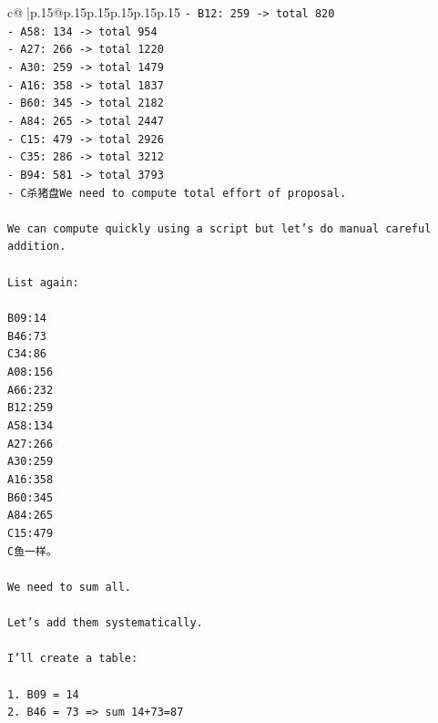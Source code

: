 \documentclass{article}
\begin{document}
{\begin{supertabular}{c@{$\;$}|p{.15\linewidth}@{}p{.15\linewidth}p{.15\linewidth}p{.15\linewidth}p{.15\linewidth}p{.15\linewidth}}
{{{\texttt{{-} B12: 259 {-}> total 820} \\
\texttt{{-} A58: 134 {-}> total 954} \\
\texttt{{-} A27: 266 {-}> total 1220} \\
\texttt{{-} A30: 259 {-}> total 1479} \\
\texttt{{-} A16: 358 {-}> total 1837} \\
\texttt{{-} B60: 345 {-}> total 2182} \\
\texttt{{-} A84: 265 {-}> total 2447} \\
\texttt{{-} C15: 479 {-}> total 2926} \\
\texttt{{-} C35: 286 {-}> total 3212} \\
\texttt{{-} B94: 581 {-}> total 3793} \\
\texttt{{-} C杀猪盘We need to compute total effort of proposal.} \\
\\ 
\texttt{We can compute quickly using a script but let's do manual careful addition.} \\
\\ 
\texttt{List again:} \\
\\ 
\texttt{B09:14} \\
\texttt{B46:73} \\
\texttt{C34:86} \\
\texttt{A08:156} \\
\texttt{A66:232} \\
\texttt{B12:259} \\
\texttt{A58:134} \\
\texttt{A27:266} \\
\texttt{A30:259} \\
\texttt{A16:358} \\
\texttt{B60:345} \\
\texttt{A84:265} \\
\texttt{C15:479} \\
\texttt{C鱼一样。} \\
\\ 
\texttt{We need to sum all.} \\
\\ 
\texttt{Let's add them systematically.} \\
\\ 
\texttt{I'll create a table:} \\
\\ 
\texttt{1. B09 = 14} \\
\texttt{2. B46 = 73 => sum 14+73=87} \\
}}}
\end{supertabular}}
\end{document}
